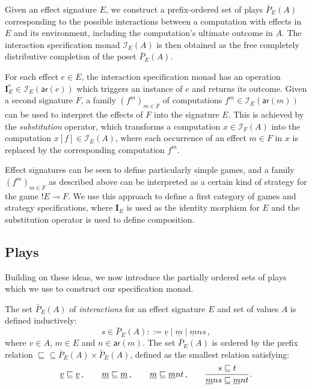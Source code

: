 \documentclass[sigplan,screen]{acmart}
\newcommand{\kw}[1]{\ensuremath{ \mathsf{#1} }}
\begin{document}
Given an effect signature $E$,
we construct a prefix-ordered set of plays $\bar{P}_E(A)$
corresponding to the possible interactions between
a computation with effects in $E$
and its environment,
including the computation's ultimate outcome in $A$.
The interaction specification monad $\mathcal{I}_E(A)$ is then obtained
as the free completely distributive completion of the poset $\bar{P}_E(A)$.

For each effect $e \in E$,
the interaction specification monad
has an operation
$\mathbf{I}_E^e \in \mathcal{I}_E(\kw{ar}(e))$
which triggers an instance of $e$ and returns its outcome.
Given a second signature $F$,
a family $(f^m)_{m \in F}$ of computations
$f^m \in \mathcal{I}_E(\kw{ar}(m))$
can be used to interpret the effects of $F$
into the signature $E$.
This is achieved by the \emph{substitution} operator,
which transforms a computation $x \in \mathcal{I}_F(A)$
into the computation $x[f] \in \mathcal{I}_E(A)$,
where each occurrence of an effect $m \in F$ in $x$
is replaced by the corresponding computation $f^m$.

Effect signatures can be seen to define
particularly simple games,
and a family $(f^m)_{m \in F}$ as described above
can be interpreted as
a certain kind of strategy for the game ${!E} \multimap F$.
We use this approach to define
a first category of games and strategy specifications,
where $\mathbf{I}_E$ is used as
the identity morphism for $E$ and
the substitution operator is used to define composition.


\subsection{Plays} \label{sec:intm:plays} %

Building on these ideas,
we now introduce the partially ordered sets of plays
which we use to construct our specification monad.

\begin{definition}
The set $\bar{P}_E(A)$ of \emph{interactions}
for an effect signature $E$ and set of values $A$
is defined inductively:
\[
  s \in \bar{P}_E(A) ::=
    \underline{v} \mid
    \underline{m} \mid
    \underline{m} n s \,,
\]
where $v \in A$, $m \in E$ and $n \in \kw{ar}(m)$.
The set $\bar{P}_E(A)$ is ordered by the prefix relation
${\sqsubseteq} \subseteq \bar{P}_E(A) \times \bar{P}_E(A)$,
defined
as the smallest relation satisfying:
\[
  \underline{v} \sqsubseteq \underline{v} \,, \qquad
  \underline{m} \sqsubseteq \underline{m} \,, \qquad
  \underline{m} \sqsubseteq \underline{m} n t \,, \qquad
  \begin{prooftree}
    \hypo{s \sqsubseteq t}
    \infer1{\underline{m} n s \sqsubseteq \underline{m} n t}
  \end{prooftree} \,.
\]
\end{definition}
\end{document}
